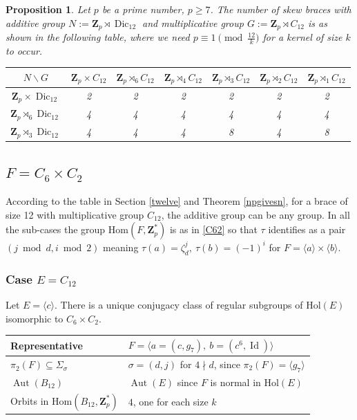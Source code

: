 \documentclass[12pt]{article}
\newtheorem{proposition}[theorem]{Proposition}
\theoremstyle{definition}
\newcommand{\Z}{\mathbf Z}
\newcommand{\Hol}{\mathrm{Hol}}
\newcommand{\Hom}{\mathrm{Hom}}
\newcommand{\Aut}{\operatorname{Aut}}
\newcommand{\Id}{\operatorname{Id}}
\newcommand{\Dic}{\operatorname{Dic}}
\begin{document}
\begin{proposition}
	Let $p$ be a prime number, $p\geq 7$.
	The number of skew braces with additive group $N:=\Z_p \rtimes \Dic_{12}$ and multiplicative group $G:=\Z_p\rtimes C_{12}$ is as shown in the following table, where we need $p\equiv 1 \pmod{\frac {12}k}$ for a kernel of size $k$ to occur.
	
	\begin{center}
		\begin{tabular}{|c||c|c|c|c|c|c|}
			\hline
			$N \backslash G$ & $\Z_p\times C_{12}$ & $\Z_p\rtimes_{6} C_{12}$ & $\Z_p\rtimes_{4} C_{12}$ & $\Z_p\rtimes_{3} C_{12}$ & $\Z_p\rtimes_{2} C_{12}$& $\Z_p\rtimes_{1} C_{12}$\\
			\hline
			\hline
			$\Z_p \times \Dic_{12}$ &2 & 2 & 2 &2 &2 & 2 \\
			\hline
			$\Z_p \rtimes_{6} \Dic_{12}$ &4& 4  & 4& 4& 4 & 4 \\
			\hline
			$\Z_p \rtimes_{3} \Dic_{12}$ &4 & 4 & 4 & 8 & 4 & 8 \\
			\hline
		\end{tabular}
	\end{center}
\end{proposition}


\subsection{$F=C_{6}\times C_2$}

According to the table in Section \ref{twelve} and Theorem \ref{npgivesn}, for a brace of size 12 with multiplicative group  $C_{12}$, the additive group can
be any group.  In all the sub-cases the group $\Hom(F,\Z_p^*)$ is as in \ref{C62} so that
$\tau$ identifies as a pair $(j\bmod d ,i\bmod 2)$ meaning
$\tau(a)=\zeta_d^j, \ \tau(b)=(-1)^i$ for $F=\langle a\rangle \times \langle b\rangle $.


\subsubsection*{Case $E=C_{12}$}

Let $E=\langle c\rangle$. There is a unique conjugacy class of regular subgroups of $\Hol(E)$ isomorphic to $C_6\times C_2$.  

\begin{center}
    \begin{tabular}{|l|l|}
    \hline
      Representative& $F=\langle  a=(c,g_7) ,\ b=(c^6,\Id)\rangle$ \\
      \hline
      $\pi_2(F)\subseteq \Sigma_{\sigma}$ &  $\sigma=(d,j)$ for $4\nmid d$, since $\pi_2(F)=\langle g_7\rangle$ \\
      $\Aut(B_{12})$ & $\Aut(E)$ since $F$ is normal in $\Hol(E)$\\
      Orbits in $\Hom(B_{12},\Z_p^*)$ & $4$, one for each size $k$\\
      \hline
    \end{tabular}
\end{center}    
    
\end{document}
